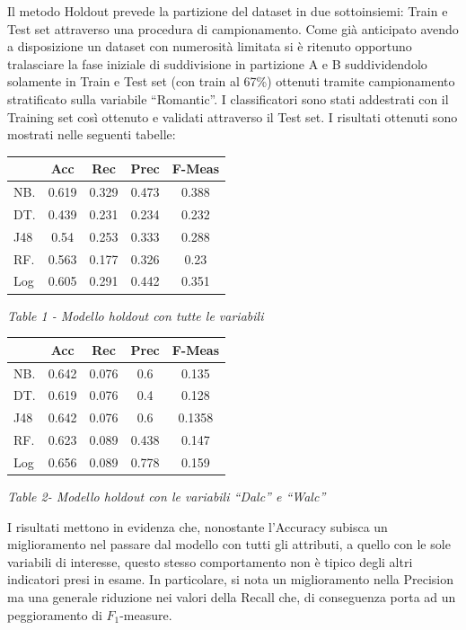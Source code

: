 \documentclass[12pt,a4paper]{report}
\begin{document}
\begin{multicols}{2}
Il metodo Holdout prevede la partizione del dataset in due sottoinsiemi: Train e Test set attraverso una procedura di campionamento. Come già anticipato avendo a disposizione un dataset con numerosità limitata si è ritenuto opportuno tralasciare la fase iniziale di suddivisione in partizione A e B suddividendolo solamente in Train e Test set (con train al 67\%) ottenuti tramite campionamento stratificato sulla variabile “Romantic”. I classificatori sono stati addestrati con il Training set così ottenuto e validati attraverso il Test set. I risultati ottenuti sono mostrati nelle seguenti tabelle:\begin{center}
		\begin{tabular}{|>{\centering\arraybackslash}m{1cm}|c|c|c|c|}
			\hline
			& Acc & Rec & Prec & F-Meas \\
			\hline
			NB. & 0.619 & 0.329 & 0.473 &
			0.388
			\\
			\hline
			DT. & 0.439  & 0.231 & 0.234 & 0.232 \\
			\hline
			J48 & 0.54 & 0.253 & 0.333 & 0.288 \\
			\hline
			RF. & 0.563 & 0.177 &  0.326& 0.23 \\
			\hline
			Log & 0.605 & 0.291 &
			0.442
			&  0.351\\
			\hline
		\end{tabular}
	\end{center}
\begin{center}
	\textit{Table 1 - Modello holdout con tutte le variabili}
\end{center}
\begin{center}
	\begin{tabular}{|>{\centering\arraybackslash}m{1cm}|c|c|c|c|}
		\hline
		& Acc & Rec & Prec & F-Meas \\
		\hline
		NB. & 0.642 & 0.076 & 0.6&
		0.135
		\\
		\hline
		DT. & 0.619  & 0.076 & 0.4 & 0.128 \\
		\hline
		J48 & 0.642 & 0.076 & 0.6 & 0.1358 \\
		\hline
		RF. & 0.623 & 0.089 &  0.438& 0.147 \\
		\hline
		Log & 0.656 & 0.089 &
		0.778
		&  0.159\\
		\hline
		\end{tabular}
\end{center}
\begin{center}
	\textit{Table 2- Modello holdout con le variabili “Dalc” e “Walc”}
\end{center}
I risultati mettono in evidenza che, nonostante l’Accuracy subisca un miglioramento nel passare dal modello con tutti gli attributi, a quello con le sole variabili di interesse, questo stesso comportamento non è tipico degli altri indicatori presi in esame. In particolare, si nota un miglioramento nella Precision ma una generale riduzione nei valori della Recall che, di conseguenza porta ad un peggioramento di $F_1$-measure. 


\end{multicols}
\end{document}
